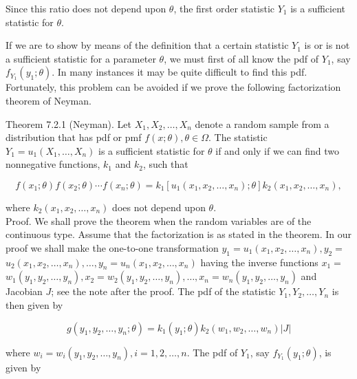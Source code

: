 Since this ratio does not depend upon $\theta$, the first order statistic $Y_{1}$ is a sufficient statistic for $\theta$.

If we are to show by means of the definition that a certain statistic $Y_{1}$ is or is not a sufficient statistic for a parameter $\theta$, we must first of all know the pdf of $Y_{1}$, say $f_{Y_{1}}\left(y_{1} ; \theta\right)$. In many instances it may be quite difficult to find this pdf. Fortunately, this problem can be avoided if we prove the following factorization theorem of Neyman.

Theorem 7.2.1 (Neyman). Let $X_{1}, X_{2}, \ldots, X_{n}$ denote a random sample from a distribution that has pdf or pmf $f(x ; \theta), \theta \in \Omega$. The statistic $Y_{1}=u_{1}\left(X_{1}, \ldots, X_{n}\right)$ is a sufficient statistic for $\theta$ if and only if we can find two nonnegative functions, $k_{1}$ and $k_{2}$, such that


\begin{equation*}
f\left(x_{1} ; \theta\right) f\left(x_{2} ; \theta\right) \cdots f\left(x_{n} ; \theta\right)=k_{1}\left[u_{1}\left(x_{1}, x_{2}, \ldots, x_{n}\right) ; \theta\right] k_{2}\left(x_{1}, x_{2}, \ldots, x_{n}\right), \tag{7.2.1}
\end{equation*}


where $k_{2}\left(x_{1}, x_{2}, \ldots, x_{n}\right)$ does not depend upon $\theta$.\\
Proof. We shall prove the theorem when the random variables are of the continuous type. Assume that the factorization is as stated in the theorem. In our proof we shall make the one-to-one transformation $y_{1}=u_{1}\left(x_{1}, x_{2}, \ldots, x_{n}\right), y_{2}=$ $u_{2}\left(x_{1}, x_{2}, \ldots, x_{n}\right), \ldots, y_{n}=u_{n}\left(x_{1}, x_{2}, \ldots, x_{n}\right)$ having the inverse functions $x_{1}=$ $w_{1}\left(y_{1}, y_{2}, \ldots, y_{n}\right), x_{2}=w_{2}\left(y_{1}, y_{2}, \ldots, y_{n}\right), \ldots, x_{n}=w_{n}\left(y_{1}, y_{2}, \ldots, y_{n}\right)$ and Jacobian $J$; see the note after the proof. The pdf of the statistic $Y_{1}, Y_{2}, \ldots, Y_{n}$ is then given by

$$
g\left(y_{1}, y_{2}, \ldots, y_{n} ; \theta\right)=k_{1}\left(y_{1} ; \theta\right) k_{2}\left(w_{1}, w_{2}, \ldots, w_{n}\right)|J|
$$

where $w_{i}=w_{i}\left(y_{1}, y_{2}, \ldots, y_{n}\right), i=1,2, \ldots, n$. The pdf of $Y_{1}$, say $f_{Y_{1}}\left(y_{1} ; \theta\right)$, is given by

